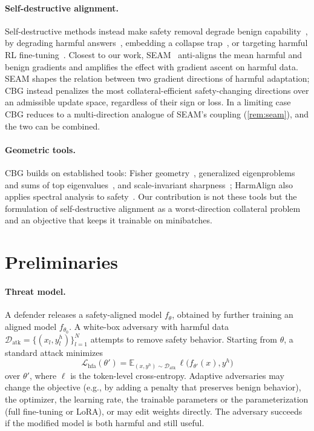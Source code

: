 \documentclass[11pt]{article}
\newcommand{\Lhfa}{\mathcal{L}_{\mathrm{hfa}}}
\begin{document}
\paragraph{Self-destructive alignment.}
Self-destructive methods instead make safety removal degrade benign capability~\citep{henderson2023self}, by degrading harmful answers~\citep{chen2025sdd}, embedding a collapse trap~\citep{yi2026ctrap}, or targeting harmful RL fine-tuning~\citep{feng2026tokenbuncher}. Closest to our work, SEAM~\citep{wang2026seam} anti-aligns the mean harmful and benign gradients and amplifies the effect with gradient ascent on harmful data. SEAM shapes the relation between two gradient directions of harmful adaptation; CBG instead penalizes the most collateral-efficient safety-changing directions over an admissible update space, regardless of their sign or loss. In a limiting case CBG reduces to a multi-direction analogue of SEAM's coupling (\cref{rem:seam}), and the two can be combined.

\paragraph{Geometric tools.}
CBG builds on established tools: Fisher geometry~\citep{amari1998natural,martens2020new,kunstner2019limitations}, generalized eigenproblems and sums of top eigenvalues~\citep{parlett1998symmetric,golub2013matrix,overton1993optimality}, and scale-invariant sharpness~\citep{dinh2017sharp,foret2021sharpness,kwon2021asam}; HarmAlign also applies spectral analysis to safety~\citep{rosati2026harmalign}. Our contribution is not these tools but the formulation of self-destructive alignment as a worst-direction collateral problem and an objective that keeps it trainable on minibatches.



\section{Preliminaries}
\label{sec:preliminaries}

\paragraph{Threat model.}
A defender releases a safety-aligned model $f_\theta$, obtained by further training an aligned model $f_{\theta_0}$. A white-box adversary with harmful data $\mathcal D_{\mathrm{atk}}=\{(x_l,y_l^h)\}_{l=1}^{N}$ attempts to remove safety behavior. Starting from $\theta$, a standard attack minimizes
\begin{equation}
\Lhfa(\theta')=\mathbb E_{(x,y^h)\sim\mathcal D_{\mathrm{atk}}}\,\ell\bigl(f_{\theta'}(x),y^h\bigr)
\label{eq:hfa}
\end{equation}
over $\theta'$, where $\ell$ is the token-level cross-entropy. Adaptive adversaries may change the objective (e.g., by adding a penalty that preserves benign behavior), the optimizer, the learning rate, the trainable parameters or the parameterization (full fine-tuning or LoRA), or may edit weights directly. The adversary succeeds if the modified model is both harmful and still useful.
\end{document}
